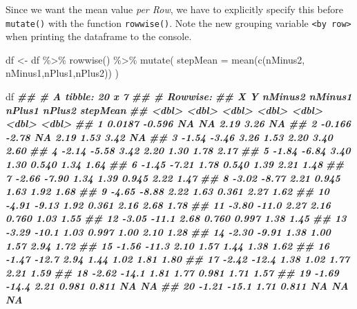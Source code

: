 \documentclass[
]{book}
\newenvironment{Shaded}{\begin{snugshade}}{\end{snugshade}}
\newcommand{\AttributeTok}[1]{\textcolor[rgb]{0.77,0.63,0.00}{#1}}
\newcommand{\DocumentationTok}[1]{\textcolor[rgb]{0.56,0.35,0.01}{\textbf{\textit{#1}}}}
\newcommand{\FunctionTok}[1]{\textcolor[rgb]{0.00,0.00,0.00}{#1}}
\newcommand{\NormalTok}[1]{#1}
\newcommand{\OtherTok}[1]{\textcolor[rgb]{0.56,0.35,0.01}{#1}}
\newcommand{\SpecialCharTok}[1]{\textcolor[rgb]{0.00,0.00,0.00}{#1}}
\begin{document}
Since we want the mean value \emph{per Row}, we have to explicitly specify this before \texttt{mutate()} with the function \texttt{rowwise()}. Note the new grouping variable \texttt{\textless{}by\ row\textgreater{}} when printing the dataframe to the console.

\begin{Shaded}
\begin{Highlighting}[]
\NormalTok{df }\OtherTok{\textless{}{-}}\NormalTok{ df }\SpecialCharTok{\%\textgreater{}\%}
  \FunctionTok{rowwise}\NormalTok{() }\SpecialCharTok{\%\textgreater{}\%}
  \FunctionTok{mutate}\NormalTok{(}
    \AttributeTok{stepMean =} \FunctionTok{mean}\NormalTok{(}\FunctionTok{c}\NormalTok{(nMinus2, nMinus1,nPlus1,nPlus2))}
\NormalTok{  )}

\NormalTok{df}
\DocumentationTok{\#\# \# A tibble: 20 x 7}
\DocumentationTok{\#\# \# Rowwise: }
\DocumentationTok{\#\#          X       Y nMinus2 nMinus1 nPlus1 nPlus2 stepMean}
\DocumentationTok{\#\#      \textless{}dbl\textgreater{}   \textless{}dbl\textgreater{}   \textless{}dbl\textgreater{}   \textless{}dbl\textgreater{}  \textless{}dbl\textgreater{}  \textless{}dbl\textgreater{}    \textless{}dbl\textgreater{}}
\DocumentationTok{\#\#  1  0.0187  {-}0.596   NA     NA      2.19    3.26    NA   }
\DocumentationTok{\#\#  2 {-}0.166   {-}2.78    NA      2.19   1.53    3.42    NA   }
\DocumentationTok{\#\#  3 {-}1.54    {-}3.46     3.26   1.53   2.20    3.40     2.60}
\DocumentationTok{\#\#  4 {-}2.14    {-}5.58     3.42   2.20   1.30    1.78     2.17}
\DocumentationTok{\#\#  5 {-}1.84    {-}6.84     3.40   1.30   0.540   1.34     1.64}
\DocumentationTok{\#\#  6 {-}1.45    {-}7.21     1.78   0.540  1.39    2.21     1.48}
\DocumentationTok{\#\#  7 {-}2.66    {-}7.90     1.34   1.39   0.945   2.22     1.47}
\DocumentationTok{\#\#  8 {-}3.02    {-}8.77     2.21   0.945  1.63    1.92     1.68}
\DocumentationTok{\#\#  9 {-}4.65    {-}8.88     2.22   1.63   0.361   2.27     1.62}
\DocumentationTok{\#\# 10 {-}4.91    {-}9.13     1.92   0.361  2.16    2.68     1.78}
\DocumentationTok{\#\# 11 {-}3.80   {-}11.0      2.27   2.16   0.760   1.03     1.55}
\DocumentationTok{\#\# 12 {-}3.05   {-}11.1      2.68   0.760  0.997   1.38     1.45}
\DocumentationTok{\#\# 13 {-}3.29   {-}10.1      1.03   0.997  1.00    2.10     1.28}
\DocumentationTok{\#\# 14 {-}2.30    {-}9.91     1.38   1.00   1.57    2.94     1.72}
\DocumentationTok{\#\# 15 {-}1.56   {-}11.3      2.10   1.57   1.44    1.38     1.62}
\DocumentationTok{\#\# 16 {-}1.47   {-}12.7      2.94   1.44   1.02    1.81     1.80}
\DocumentationTok{\#\# 17 {-}2.42   {-}12.4      1.38   1.02   1.77    2.21     1.59}
\DocumentationTok{\#\# 18 {-}2.62   {-}14.1      1.81   1.77   0.981   1.71     1.57}
\DocumentationTok{\#\# 19 {-}1.69   {-}14.4      2.21   0.981  0.811  NA       NA   }
\DocumentationTok{\#\# 20 {-}1.21   {-}15.1      1.71   0.811 NA      NA       NA}
\end{Highlighting}
\end{Shaded}
\end{document}
